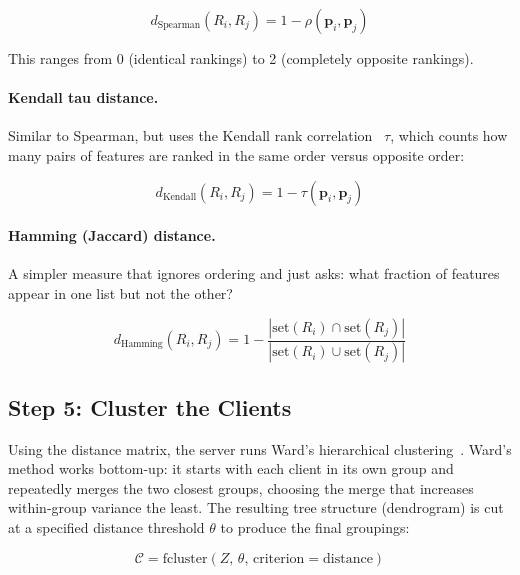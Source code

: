 \documentclass[information,article,submit,pdftex]{mdpi}
\begin{document}
\begin{equation}\label{eq:spearman}
  d_{\text{Spearman}}(R_i, R_j) = 1 - \rho(\mathbf{p}_i, \mathbf{p}_j)
\end{equation}

This ranges from 0 (identical rankings) to 2 (completely opposite rankings).

\paragraph{Kendall tau distance.} Similar to Spearman, but uses the Kendall rank
correlation~\cite{kendall1938measure} $\tau$, which counts how many pairs of
features are ranked in the same order versus opposite order:

\begin{equation}\label{eq:kendall}
  d_{\text{Kendall}}(R_i, R_j) = 1 - \tau(\mathbf{p}_i, \mathbf{p}_j)
\end{equation}

\paragraph{Hamming (Jaccard) distance.} A simpler measure that ignores ordering
and just asks: what fraction of features appear in one list but not the other?

\begin{equation}\label{eq:hamming}
  d_{\text{Hamming}}(R_i, R_j) =
  1 - \frac{|\text{set}(R_i) \cap \text{set}(R_j)|}{|\text{set}(R_i) \cup
  \text{set}(R_j)|}
\end{equation}

\subsection{Step 5: Cluster the Clients}

Using the distance matrix, the server runs Ward's hierarchical
clustering~\cite{ward1963hierarchical}. Ward's method works bottom-up: it starts
with each client in its own group and repeatedly merges the two closest groups,
choosing the merge that increases within-group variance the least. The resulting
tree structure (dendrogram) is cut at a specified distance threshold $\theta$ to
produce the final groupings:

\begin{equation}
  \mathcal{C} = \text{fcluster}(Z,\, \theta,\, \text{criterion} = \text{distance})
\end{equation}
\end{document}
